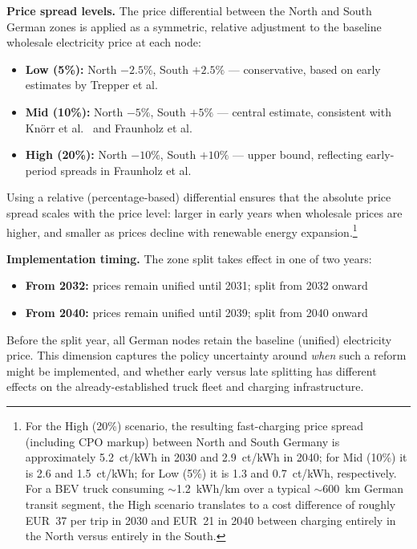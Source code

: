 \documentclass[conference]{IEEEtran}
\begin{document}
\textbf{Price spread levels.}
The price differential between the North and South German zones is applied as a symmetric, relative adjustment to the baseline wholesale electricity price at each node:
\begin{itemize}
    \item \textbf{Low (5\%):} North $-2.5\%$, South $+2.5\%$ --- conservative, based on early estimates by Trepper et al.~\cite{b_trepper2015}
    \item \textbf{Mid (10\%):} North $-5\%$, South $+5\%$ --- central estimate, consistent with Kn\"orr et al.~\cite{b_knorr2025} and Fraunholz et al.~\cite{b_fraunholz2021}
    \item \textbf{High (20\%):} North $-10\%$, South $+10\%$ --- upper bound, reflecting early-period spreads in Fraunholz et al.~\cite{b_fraunholz2021}
\end{itemize}
Using a relative (percentage-based) differential ensures that the absolute price spread scales with the price level: larger in early years when wholesale prices are higher, and smaller as prices decline with renewable energy expansion.\footnote{For the High (20\%) scenario, the resulting fast-charging price spread (including CPO markup) between North and South Germany is approximately 5.2~ct/kWh in 2030 and 2.9~ct/kWh in 2040; for Mid (10\%) it is 2.6 and 1.5~ct/kWh; for Low (5\%) it is 1.3 and 0.7~ct/kWh, respectively. For a BEV truck consuming $\sim$1.2~kWh/km over a typical $\sim$600~km German transit segment, the High scenario translates to a cost difference of roughly EUR~37 per trip in 2030 and EUR~21 in 2040 between charging entirely in the North versus entirely in the South.}

\textbf{Implementation timing.}
The zone split takes effect in one of two years:
\begin{itemize}
    \item \textbf{From 2032:} prices remain unified until 2031; split from 2032 onward
    \item \textbf{From 2040:} prices remain unified until 2039; split from 2040 onward
\end{itemize}
Before the split year, all German nodes retain the baseline (unified) electricity price. This dimension captures the policy uncertainty around \emph{when} such a reform might be implemented, and whether early versus late splitting has different effects on the already-established truck fleet and charging infrastructure.
\end{document}
